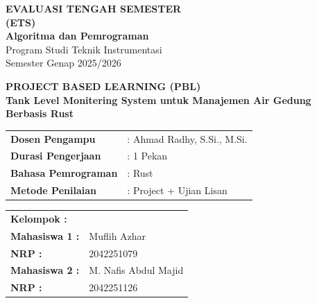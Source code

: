 \documentclass[12pt,a4paper]{article}
\begin{document}
\begin{titlepage}
    \centering
    
    {\LARGE \textbf{EVALUASI TENGAH SEMESTER}} \\[0.2cm]
    {\LARGE \textbf{(ETS)}} \\[0.5cm]
    
    {\Large \textbf{Algoritma dan Pemrograman}} \\[0.8cm]
    
    {\large Program Studi Teknik Instrumentasi} \\[0.2cm]
    {\large Semester Genap 2025/2026} \\[1.5cm]
    
    \begin{tcolorbox}[
        colback=boxblue, 
        colframe=borderblue, 
        width=0.9\textwidth, 
        arc=5pt, 
        boxrule=1pt,
        center title,
        halign=center
    ]
        \centering
        \textbf{\large PROJECT BASED LEARNING (PBL)} \\[0.3cm]
        \textbf{Tank Level Monitering System untuk Manajemen Air Gedung \\ Berbasis Rust}
    \end{tcolorbox}
    
    \vfill 
    
    \begin{flushleft}
    \hspace{2.5cm} 
    \begin{tabular}{ll}
        \textbf{Dosen Pengampu}  & : Ahmad Radhy, S.Si., M.Si. \\
        \textbf{Durasi Pengerjaan} & : 1 Pekan \\
        \textbf{Bahasa Pemrograman} & : Rust \\
        \textbf{Metode Penilaian}  & : Project + Ujian Lisan \\
    \end{tabular}
    \end{flushleft}
    
    \vspace{1.5cm}
    
    \begin{flushleft}
    \hspace{2.5cm}
    \begin{tabular}{ll}
        \textbf{Kelompok :} &  \\[0.3cm] 
        \textbf{Mahasiswa 1 :} & Muflih Azhar \\[0.1cm]
        \textbf{NRP :} & 2042251079 \\[0.3cm]
        \textbf{Mahasiswa 2 :} & M. Nafis Abdul Majid \\[0.1cm]
        \textbf{NRP :} & 2042251126 \\
    \end{tabular}
    \end{flushleft}
    

\end{titlepage}
\end{document}
